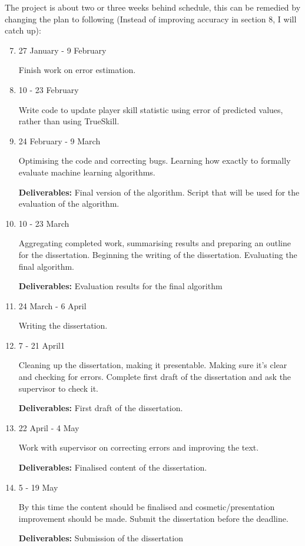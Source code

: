 \documentclass[11pt, a4paper]{article}
\begin{document}
The project is about two or three weeks behind schedule, this can be remedied by changing the plan to following (Instead of improving accuracy in section 8, I will catch up): 
\begin{enumerate}
\setcounter{enumi}{6}
\item
27 January - 9 February

Finish work on error estimation.

\item
10 - 23 February

Write code to update player skill statistic using error of predicted values, rather than using TrueSkill.

\item
24 February - 9 March

Optimising the code and correcting bugs. Learning how exactly to formally evaluate machine learning algorithms.

\textbf{Deliverables:} Final version of the algorithm. Script that will be used for the evaluation of the algorithm.

\item
10 - 23 March

Aggregating completed work, summarising results and preparing an outline for the dissertation. Beginning the writing of the dissertation. Evaluating the final algorithm.

\textbf{Deliverables:} Evaluation results for the final algorithm

\item

24 March - 6 April

Writing the dissertation.

\item

7 - 21 April1

Cleaning up the dissertation, making it presentable. Making sure it's clear and checking for errors. Complete first draft of the dissertation and ask the supervisor to check it.

\textbf{Deliverables:} First draft of the dissertation.

\item
22 April - 4 May

Work with supervisor on correcting errors and improving the text.

\textbf{Deliverables:} Finalised content of the dissertation.

\item
5 - 19 May

By this time the content should be finalised and cosmetic/presentation improvement should be made. Submit the dissertation before the deadline.

\textbf{Deliverables:} Submission of the dissertation
\end{enumerate}
\end{document}
